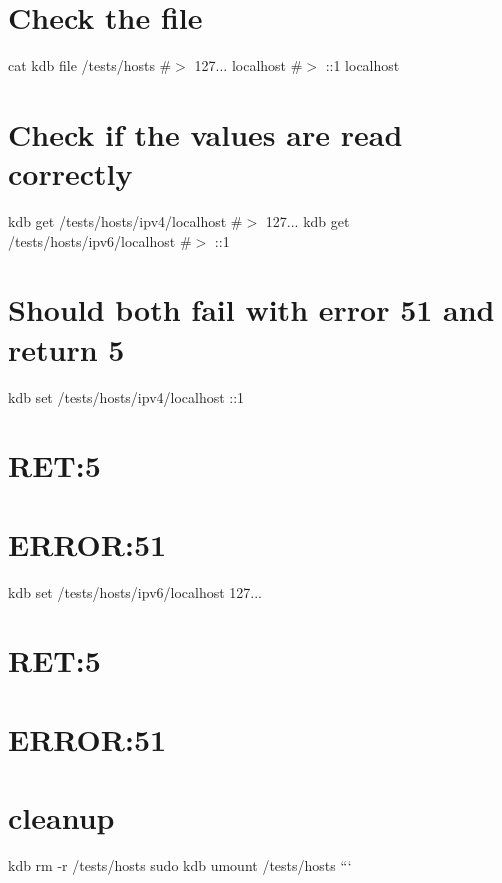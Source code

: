 \section*{Check the file}

cat {\ttfamily kdb file /tests/hosts} \#$>$ 127... localhost \#$>$ \+:\+:1 localhost

\section*{Check if the values are read correctly}

kdb get /tests/hosts/ipv4/localhost \#$>$ 127... kdb get /tests/hosts/ipv6/localhost \#$>$ \+:\+:1

\section*{Should both fail with error 51 and return 5}

kdb set /tests/hosts/ipv4/localhost \+:\+:1 \section*{R\+ET\+:5}

\section*{E\+R\+R\+OR\+:51}

kdb set /tests/hosts/ipv6/localhost 127... \section*{R\+ET\+:5}

\section*{E\+R\+R\+OR\+:51}

\section*{cleanup}

kdb rm -\/r /tests/hosts sudo kdb umount /tests/hosts ``` 